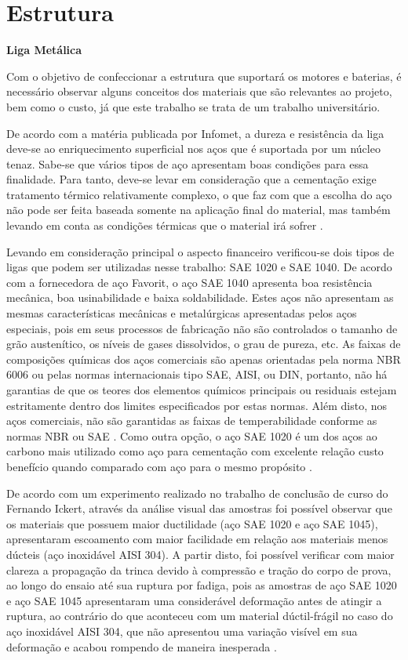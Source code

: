 \section{Estrutura}

	\textbf{Liga Metálica}


	Com o objetivo de confeccionar a estrutura que suportará os motores e baterias, é necessário observar alguns conceitos dos materiais que são relevantes ao projeto, bem como o custo, já que este trabalho se trata de um trabalho universitário.

	De acordo com a matéria publicada por Infomet, a dureza e resistência da liga deve-se ao enriquecimento superficial nos aços que é suportada por um núcleo tenaz. Sabe-se que vários tipos de aço apresentam boas condições para essa finalidade. Para tanto, deve-se levar em consideração que a cementação exige tratamento térmico relativamente complexo, o que faz com que a escolha do aço não pode ser feita baseada somente na aplicação final do material, mas também levando em conta as condições térmicas que o material irá sofrer \cite{ensaio_fadiga}.

	Levando em consideração principal o aspecto financeiro verificou-se dois tipos de ligas que podem ser utilizadas nesse trabalho: SAE 1020 e SAE 1040. De acordo com a fornecedora de aço Favorit, o aço SAE 1040 apresenta boa resistência mecânica, boa usinabilidade e baixa soldabilidade. Estes aços não apresentam as mesmas características mecânicas e metalúrgicas apresentadas pelos aços especiais, pois em seus processos de fabricação não são controlados o tamanho de grão austenítico, os níveis de gases dissolvidos, o grau de pureza, etc. As faixas de composições químicas dos aços comerciais são apenas orientadas pela norma NBR 6006 ou pelas normas internacionais tipo SAE, AISI, ou DIN, portanto, não há garantias de que os teores dos elementos químicos principais ou residuais estejam estritamente dentro dos limites especificados por estas normas. Além disto, nos aços comerciais, não são garantidas as faixas de temperabilidade conforme as normas NBR ou SAE \cite{favorit}. Como outra opção, o aço SAE 1020 é um dos aços ao carbono mais utilizado como aço para cementação com excelente relação custo benefício quando comparado com aço para o mesmo propósito \cite{metals}.

	De acordo com um experimento realizado no trabalho de conclusão de curso do Fernando Ickert, através da análise visual das amostras foi possível observar que os materiais que possuem maior ductilidade (aço SAE 1020 e aço SAE 1045), apresentaram escoamento com maior facilidade em relação aos materiais menos dúcteis (aço inoxidável AISI 304). A partir disto, foi possível verificar com maior clareza a propagação da trinca devido à compressão e tração do corpo de prova, ao longo do ensaio até sua ruptura por fadiga, pois as amostras de aço SAE 1020 e aço SAE 1045 apresentaram uma considerável deformação antes de atingir a ruptura, ao contrário do que aconteceu com um material dúctil-frágil no caso do aço inoxidável AISI 304, que não apresentou uma variação visível em sua deformação e acabou rompendo de maneira inesperada \cite{ensaio_fadiga}.

